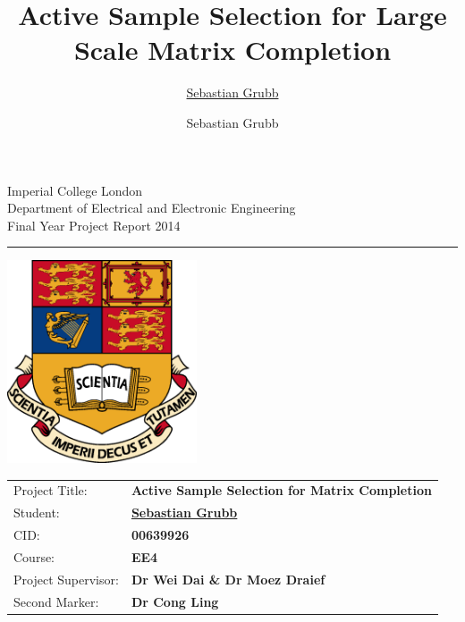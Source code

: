 \documentclass[oneside,11pt]{Classes/CUEDthesisPSnPDF}
\title{Active Sample Selection for Large Scale Matrix Completion}
\author{\href{mailto:sg3510@ic.ac.uk}{Sebastian Grubb}}
\author{Sebastian Grubb}
\newcounter{col}
\begin{document}
\begin{titlepage}
\setlength{\parindent}{0pt}
\setlength{\parskip}{0pt}

{
\Large
\raggedright
Imperial College London\\[12pt]
Department of Electrical and Electronic Engineering\\[12pt]
Final Year Project Report 2014\\[12pt]

}
\rule{\columnwidth}{3pt}

\vfill

\centering
\includegraphics[width=0.6\columnwidth,height=60mm,keepaspectratio]{ThesisFigs/imperial_crest.eps}

\vfill

\setlength{\tabcolsep}{0pt}
\begin{tabular}{p{40mm}p{\dimexpr\columnwidth-40mm}}
Project Title: & \textbf{Active Sample Selection for Matrix Completion} \\[12pt]
Student: & \textbf{\href{mailto:sg3510@ic.ac.uk}{Sebastian Grubb}} \\[12pt]
CID: & \textbf{00639926} \\[12pt]
Course: & \textbf{EE4} \\[12pt]
Project Supervisor: & \textbf{Dr Wei Dai \& Dr Moez Draief} \\[12pt]
Second Marker: & \textbf{Dr Cong Ling} \\
\end{tabular}
\end{titlepage}

%   
\end{document}
